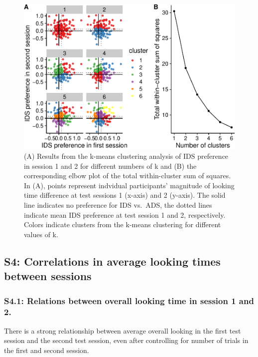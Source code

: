 \documentclass[
  man, donotrepeattitle,floatsintext]{apa6}
\begin{document}
\begin{figure}
\centering
\includegraphics{MB1T_supplement_files/figure-latex/fig2-1.pdf}
\caption{\label{fig:fig2} (A) Results from the k-means clustering analysis of IDS preference in session 1 and 2 for different numbers of k and (B) the corresponding elbow plot of the total within-cluster sum of squares. In (A), points represent indvidual participants' magnitude of looking time difference at test sessions 1 (x-axis) and 2 (y-axis). The solid line indicates no preference for IDS vs.~ADS, the dotted lines indicate mean IDS preference at test session 1 and 2, respectively. Colors indicate clusters from the k-means clustering for different values of k.}
\end{figure}

\hypertarget{s4-correlations-in-average-looking-times-between-sessions}{%
\subsection{S4: Correlations in average looking times between sessions}\label{s4-correlations-in-average-looking-times-between-sessions}}

\hypertarget{s4.1-relations-between-overall-looking-time-in-session-1-and-2.}{%
\subsubsection{S4.1: Relations between overall looking time in session 1 and 2.}\label{s4.1-relations-between-overall-looking-time-in-session-1-and-2.}}

There is a strong relationship between average overall looking in the first test session and the second test session, even after controlling for number of trials in the first and second session.
\end{document}
